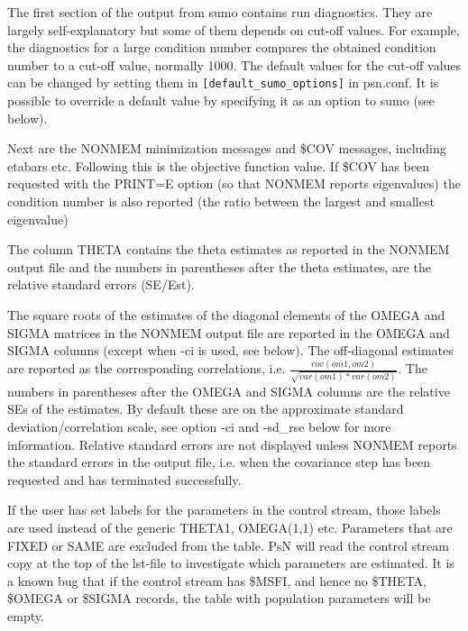 The first section of the output from sumo contains run diagnostics. They are largely self-explanatory but some of them depends on cut-off values. For example, the diagnostics for a large condition number compares the obtained condition number to a cut-off value, normally 1000. The default values for the cut-off values can be changed by setting them in 
\verb|[default_sumo_options]| in psn.conf. It is possible to override a default value by specifying it as an option to sumo (see below).

Next are the NONMEM minimization messages and \$COV messages, including etabars etc. Following this is the objective function value. If \$COV has been requested with the PRINT=E option (so that NONMEM reports eigenvalues) the condition number is also reported (the ratio between the largest and smallest eigenvalue)

The column THETA contains the theta estimates as reported in the NONMEM output file and the numbers in parentheses after the theta estimates, are the relative standard errors (SE/Est). 

The square roots of the estimates of the diagonal elements of the OMEGA and SIGMA matrices in the NONMEM output file are reported in the OMEGA and SIGMA columns (except when -ci is used, see below). The off-diagonal estimates are reported as the corresponding correlations, i.e. 
$\frac{cov(om1,om2)}{\sqrt{var(om1)*var(om2)}}$. 
The numbers in parentheses after the OMEGA and SIGMA columns are the relative SEs of the estimates. By default these are on the approximate standard deviation/correlation scale, see option -ci and -sd\_rse below for more information.
Relative standard errors are not displayed unless NONMEM reports the standard errors in the output file, i.e. when the covariance step has been requested and has terminated successfully.

If the user has set labels for the parameters in the control stream, those labels are used instead of the
generic THETA1, OMEGA(1,1) etc. Parameters that are FIXED or SAME are excluded from the table.
PsN will read the control stream copy at the top of the lst-file to investigate which parameters are estimated. It is a known
bug that if the control stream has \$MSFI, and hence no \$THETA, \$OMEGA or \$SIGMA records, the table with population parameters will be empty.


